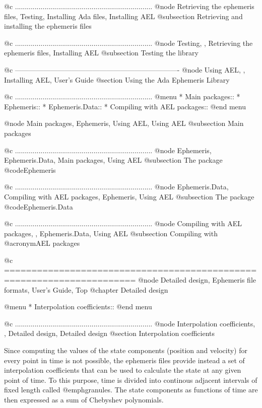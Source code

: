 @c ......................................................................
@node Retrieving the ephemeris files, Testing, Installing Ada files, Installing AEL
@subsection Retrieving and installing the ephemeris files

@c ......................................................................
@node Testing,  , Retrieving the ephemeris files, Installing AEL
@subsection Testing the library

@c ----------------------------------------------------------------------
@node Using AEL,  , Installing AEL, User's Guide
@section Using the Ada Ephemeris Library

@c ......................................................................
@menu
* Main packages::               
* Ephemeris::                   
* Ephemeris.Data::              
* Compiling with AEL packages::  
@end menu

@node Main packages, Ephemeris, Using AEL, Using AEL
@subsection Main packages

@c ......................................................................
@node Ephemeris, Ephemeris.Data, Main packages, Using AEL
@subsection The package @code{Ephemeris}


@c ......................................................................
@node Ephemeris.Data, Compiling with AEL packages, Ephemeris, Using AEL
@subsection The package @code{Ephemeris.Data}


@c ......................................................................
@node Compiling with AEL packages,  , Ephemeris.Data, Using AEL
@subsection Compiling with @acronym{AEL} packages


@c ======================================================================
@node Detailed design, Ephemeris file formats, User's Guide, Top
@chapter Detailed design

@menu
* Interpolation coefficients::  
@end menu

@c ......................................................................
@node Interpolation coefficients,  , Detailed design, Detailed design
@section Interpolation coefficients

Since computing the values of the state components (position and
velocity) for every point in time is not possible, the ephemeris
files provide instead a set of interpolation coefficients that can be used
to calculate the state at any given point of time. To this purpose,
time is divided into continous adjacent intervals of fixed length
called @emph{granules}. The state components as functions of time are
then expressed as a sum of Chebyshev polynomials.
  
